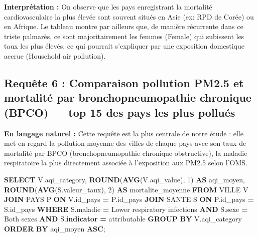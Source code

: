 \documentclass[mstat,12pt]{unswthesis}
\newenvironment{Shaded}{\begin{snugshade}}{\end{snugshade}}
\newcommand{\DecValTok}[1]{\textcolor[rgb]{0.00,0.00,0.81}{#1}}
\newcommand{\FunctionTok}[1]{\textcolor[rgb]{0.13,0.29,0.53}{\textbf{#1}}}
\newcommand{\KeywordTok}[1]{\textcolor[rgb]{0.13,0.29,0.53}{\textbf{#1}}}
\newcommand{\NormalTok}[1]{#1}
\newcommand{\OperatorTok}[1]{\textcolor[rgb]{0.81,0.36,0.00}{\textbf{#1}}}
\newcommand{\StringTok}[1]{\textcolor[rgb]{0.31,0.60,0.02}{#1}}
\begin{document}
\textbf{Interprétation :} On observe que les pays enregistrant la
mortalité cardiovasculaire la plus élevée sont souvent situés en Asie
(ex: RPD de Corée) ou en Afrique. Le tableau montre par ailleurs que, de
manière récurrente dans ce triste palmarès, ce sont majoritairement les
femmes (Female) qui subissent les taux les plus élevés, ce qui pourrait
s'expliquer par une exposition domestique accrue (Household air
pollution).

\medskip

\subsection{Requête 6 : Comparaison pollution PM2.5 et mortalité par
bronchopneumopathie chronique (BPCO) --- top 15 des pays les plus
pollués}\label{requuxeate-6-comparaison-pollution-pm2.5-et-mortalituxe9-par-bronchopneumopathie-chronique-bpco-top-15-des-pays-les-plus-polluuxe9s}

\textbf{En langage naturel :} Cette requête est la plus centrale de
notre étude : elle met en regard la pollution moyenne des villes de
chaque pays avec son taux de mortalité par BPCO (bronchopneumopathie
chronique obstructive), la maladie respiratoire la plus directement
associée à l'exposition aux PM2.5 selon l'OMS.

\begin{Shaded}
\begin{Highlighting}[]
\KeywordTok{SELECT}\NormalTok{ V.aqi\_category, }\FunctionTok{ROUND}\NormalTok{(}\FunctionTok{AVG}\NormalTok{(V.aqi\_value), }\DecValTok{1}\NormalTok{) }\KeywordTok{AS}\NormalTok{ aqi\_moyen, }\FunctionTok{ROUND}\NormalTok{(}\FunctionTok{AVG}\NormalTok{(S.valeur\_taux), }\DecValTok{2}\NormalTok{) }\KeywordTok{AS}\NormalTok{ mortalite\_moyenne }
   \KeywordTok{FROM}\NormalTok{ VILLE V }
   \KeywordTok{JOIN}\NormalTok{ PAYS P }\KeywordTok{ON}\NormalTok{ V.id\_pays }\OperatorTok{=}\NormalTok{ P.id\_pays }
   \KeywordTok{JOIN}\NormalTok{ SANTE S }\KeywordTok{ON}\NormalTok{ P.id\_pays }\OperatorTok{=}\NormalTok{ S.id\_pays }
   \KeywordTok{WHERE}\NormalTok{ S.maladie }\OperatorTok{=} \StringTok{\textquotesingle{}Lower respiratory infections\textquotesingle{}} \KeywordTok{AND}\NormalTok{ S.sexe }\OperatorTok{=} \StringTok{\textquotesingle{}Both sexes\textquotesingle{}} \KeywordTok{AND}\NormalTok{ S.}\KeywordTok{indicator} \OperatorTok{=} \StringTok{\textquotesingle{}attributable\textquotesingle{}}
   \KeywordTok{GROUP} \KeywordTok{BY}\NormalTok{ V.aqi\_category }
   \KeywordTok{ORDER} \KeywordTok{BY}\NormalTok{ aqi\_moyen }\KeywordTok{ASC}\NormalTok{;}
\end{Highlighting}
\end{Shaded}
\end{document}
